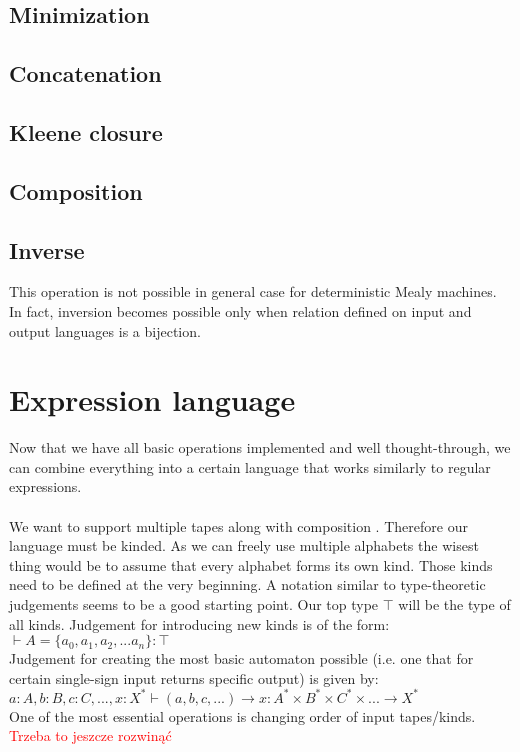 \documentclass[12pt]{article}
\begin{document}
\subsection{ Minimization}
\subsection{ Concatenation}
\subsection{ Kleene closure}
\subsection{ Composition}
\subsection{ Inverse}
This operation is not possible in general case for deterministic Mealy machines. In fact, inversion becomes possible only when relation defined on input and output languages is a bijection.


\section{Expression language}
Now that we have all basic operations implemented and well thought-through, we can combine everything into a certain language that works similarly to regular expressions.\\
\\
We want to support multiple tapes along with composition . Therefore our language must be kinded. As we can freely use multiple alphabets the wisest thing would be to assume that every alphabet forms its own kind. Those kinds need to be defined at the very beginning. A notation similar to type-theoretic judgements seems to be a good starting point. Our top type $\top$ will be the type of all kinds. Judgement for introducing new kinds is of the form:\\
$\vdash A = \{a_0, a_1, a_2, ... a_n\}  : \top $ \\
Judgement for creating the most basic automaton possible (i.e. one that for certain single-sign input returns specific output) is given by: \\
$a : A, b : B,c : C, ... , x:X^* \vdash (a,b,c,...) \rightarrow x : A^* \times B^* \times C^* \times ... \rightarrow X^* $ \\
One of the most essential operations is changing order of input tapes/kinds. 
\textcolor{red}{Trzeba to jeszcze rozwinąć} 
\end{document}

